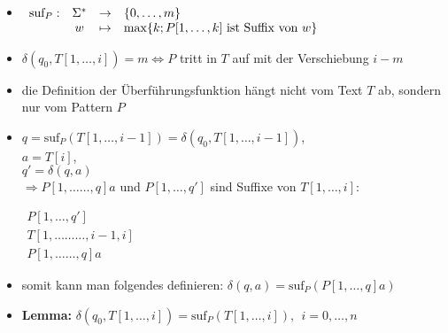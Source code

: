 \topbreak
\up\up
\begin{itemize}[itemsep=-1pt]
	\item $\begin{array}[t]{rccl}
			\text{suf}_{P} : &\Sigma^{*}&\rightarrow & \{0,\dots,m\}\\
			& w & \mapsto & \max\{k; P[1,\dots,k]\text{ ist Suffix von }w\}
		\end{array}$
	\item $\delta(q_0,T[1,\dots,i]) = m \Longleftrightarrow P$ tritt  in $T$ auf mit der Verschiebung $i-m$
	\item die Definition der Überführungsfunktion hängt nicht vom Text $T$ ab, sondern nur vom Pattern $P$
	\item $q=\text{suf}_P(T[1,\dots,i-1])=\delta(q_0,T[1,\dots,i-1])$,\\
		$a=T[i]$,\\
		$q'=\delta(q,a)$\\
		$\Rightarrow P[1,\dots\dots,q]a$ und $P[1,\dots,q']$ sind Suffixe von $T[1,\dots,i]$:\begin{center}
			$\begin{array}{r}
				P[1,\dots,q']\\
				T[1,\dots\dots\dots,i-1,i]\\
				P[1,\dots\dots,q]a
			\end{array}$\end{center}
	\item somit kann man folgendes definieren: $\delta(q,a)=\text{suf}_P(P[1,\dots,q]a)$
	\item \textbf{Lemma:} $\delta(q_0,T[1,\dots,i])=\text{suf}_P(T[1,\dots,i]),~~i=0,\dots,n$
		\up\Proof
\end{itemize}